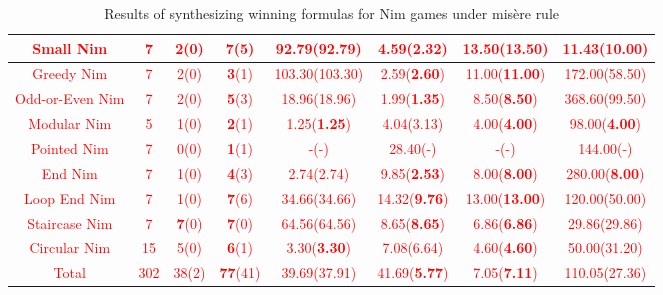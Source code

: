 \documentclass[review]{elsarticle}
\newcommand{\red}[1]{\textcolor{red}{#1}}
\begin{document}
\begin{table}[h!]
{\begin{tabular}{|c|c|c|c|c|c|c|c|}
		\red{Small Nim} & \red{7} & \red{2(0)} & \red{\textbf{7}(5)} & \red{92.79(92.79)} & \red{4.59(\textbf{2.32})} & \red{13.50(13.50)} & \red{11.43(\textbf{10.00})} \\ \hline
		\red{Greedy Nim} & \red{7} & \red{2(0)} & \red{\textbf{3}(1)} & \red{103.30(103.30)} & \red{2.59(\textbf{2.60})} & \red{11.00(\textbf{11.00})} & \red{172.00(58.50)} \\ \hline
		\red{Odd-or-Even Nim} & \red{7} & \red{2(0)} & \red{\textbf{5}(3)} & \red{18.96(18.96)} & \red{1.99(\textbf{1.35})} & \red{8.50(\textbf{8.50})} & \red{368.60(99.50)} \\ \hline
		\red{Modular Nim} & \red{5} & \red{1(0)} & \red{\textbf{2}(1)} & \red{1.25(\textbf{1.25})} & \red{4.04(3.13)} & \red{4.00(\textbf{4.00})} & \red{98.00(\textbf{4.00})} \\ \hline
		\red{Pointed Nim} & \red{7} & \red{0(0)} & \red{\textbf{1}(1)} & \red{-(-)} & \red{28.40(-)} & \red{-(-)} & \red{144.00(-)} \\ \hline
		\red{End Nim} & \red{7} & \red{1(0)} & \red{\textbf{4}(3)} & \red{2.74(2.74)} & \red{9.85(\textbf{2.53})} & \red{8.00(\textbf{8.00})} & \red{280.00(\textbf{8.00})} \\ \hline
		\red{Loop End Nim} & \red{7} & \red{1(0)} & \red{\textbf{7}(6)} & \red{34.66(34.66)} & \red{14.32(\textbf{9.76})} & \red{13.00(\textbf{13.00})} & \red{120.00(50.00)} \\ \hline
		\red{Staircase Nim} & \red{7} & \red{\textbf{7}(0)} & \red{\textbf{7}(0)} & \red{64.56(64.56)} & \red{8.65(\textbf{8.65})} & \red{6.86(\textbf{6.86})} & \red{29.86(29.86)} \\ \hline
		\red{Circular Nim} & \red{15} & \red{5(0)} & \red{\textbf{6}(1)} & \red{3.30(\textbf{3.30})} & \red{7.08(6.64)} & \red{4.60(\textbf{4.60})} & \red{50.00(31.20)} \\ \hline
		\red{Total} & \red{302} & \red{38(2)} & \red{\textbf{77}(41)} & \red{39.69(37.91)} & \red{41.69(\textbf{5.77})} & \red{7.05(\textbf{7.11})} & \red{110.05(27.36)} \\ \hline
	\end{tabular}%
	}
	\caption{Results of synthesizing winning formulas for Nim games under mis\`{e}re rule}
	\label{tab:misere-nim-winFormulas}
\end{table}
\end{document}
